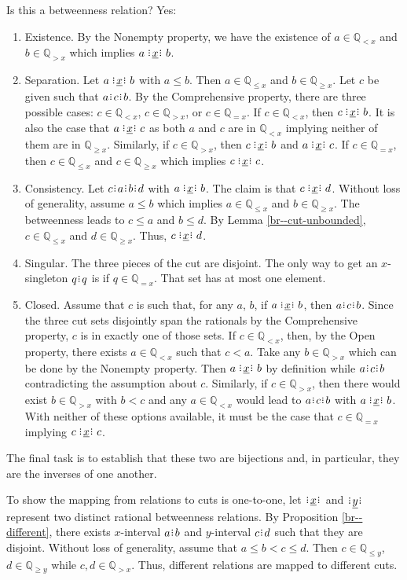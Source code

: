 \documentclass[12pt]{article}
\newcommand{\qcut}[2][x]{\ensuremath{\mathbb{Q}_{#2 #1}}}
\newcommand{\qlt}[1][x]{\qcut[#1]{<}}
\newcommand{\qeq}[1][x]{\qcut[#1]{=}}
\newcommand{\qgt}[1][x]{\qcut[#1]{>}}
\newcommand{\qgeq}[1][x]{\qcut[#1]{\geq}}
\newcommand{\qleq}[1][x]{\qcut[#1]{\leq}}
\newcommand{\yrel}{\xrel[y]}
\begin{document}
Is this a betweenness relation? Yes: 
\begin{enumerate}
    \item Existence. By the Nonempty property, we have the existence of $a \in \qlt$ and $b \in \qgt$ which implies $a \xrel b$. 
    \item Separation. Let $a \xrel b$ with $a \leq b$.  Then $a \in \qleq$ and $b \in \qgeq$. Let $c$ be given such that $a\rint c\rint b$. By the Comprehensive property, there are three possible cases: $c \in \qlt$, $c \in \qgt$, or $c \in \qeq$. If $c \in \qlt$, then  $c \xrel b$. It is also the case that \sout{$a \xrel c$} as both $a$ and $c$ are in $\qlt$ implying neither of them are in $\qgeq$. Similarly, if $c \in \qgt$, then \sout{$c \xrel b$} and $a \xrel c$. If $c \in \qeq$, then $c \in \qleq$ and $c \in \qgeq$ which implies $c \xrel c$. 
    \item Consistency. Let $c\rint a \rint b\rint d$ with $ a \xrel b$. The claim is that $c \xrel d$. Without loss of generality, assume $a \leq b$ which implies $a \in \qleq$ and $b \in \qgeq$.  The betweenness leads to $c \leq a$ and $ b \leq d$. By Lemma \ref{br--cut-unbounded},  $c \in \qleq$ and $ d \in \qgeq$. Thus, $c \xrel d$.
    \item Singular. The three pieces of the cut are disjoint. The only way to get an $x$-singleton $q\rint q$ is if $q \in \qeq$. That set has at most one element. 
    \item Closed. Assume that $c$ is such that, for any $a$, $b$, if $a \xrel b$, then $a\rint c\rint b$. Since the three cut sets disjointly span the rationals by the Comprehensive property, $c$ is in exactly one of those sets. If $c \in \qlt$, then, by the Open property, there exists $a \in \qlt$ such that $c < a$. Take any $b \in \qgt$ which can be done by the Nonempty property. Then $a \xrel b$ by definition while \sout{$a\rint c\rint b$} contradicting the assumption about $c$. Similarly, if $c \in \qgt$, then there would exist $b \in \qgt$ with $b < c$ and any $a \in \qlt$ would lead to \sout{$a\rint c\rint b$} with $a \xrel b$. With neither of these options available, it must be the case that $c \in \qeq$ implying $c \xrel c$.    
\end{enumerate}

The final task is to establish that these two are bijections and, in particular, they are the inverses of one another. 

To show the mapping from relations to cuts is one-to-one, let $\xrel$ and $\yrel$ represent two distinct rational betweenness relations. By Proposition \ref{br--different}, there exists $x$-interval $a \rint b$ and $y$-interval $c\rint d$ such that they are disjoint. Without loss of generality, assume that $a \leq b < c \leq d$. Then $c \in \qleq[y]$, $d \in \qgeq[y]$ while $c, d \in \qgt[x]$. Thus, different relations are mapped to different cuts. 
\end{document}
